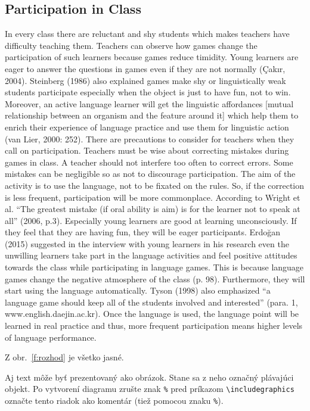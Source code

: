 \documentclass[10pt,twoside,english,a4paper]{article}
\begin{document}
 \subsection{Participation in Class }
In every class there are reluctant and shy students which makes teachers have difficulty teaching them. Teachers can observe how games change the participation of such learners because games reduce timidity. Young learners are eager to answer the questions in games even if they are not normally (Çakır, 2004). Steinberg (1986) also explained games make shy or linguistically weak students participate especially when the object is just to have fun, not to win. Moreover, an active language learner will get the linguistic affordances [mutual relationship between an organism and the feature around it] which help them to enrich their experience of language practice and use them for linguistic action (van Lier, 2000: 252). There are precautions to consider for teachers when they call on participation. Teachers must be wise about correcting mistakes during games in class. A teacher should not interfere too often to correct errors. Some mistakes can be negligible so as not to discourage participation. The aim of the activity is to use the language, not to be fixated on the rules. So, if the correction is less frequent, participation will be more commonplace. According to Wright et  al.  “The greatest  mistake (if oral ability  is aim) is  for the learner not  to speak  at all” (2006, p.3). Especially young learners are good at learning unconsciously. If they feel that they are having fun, they will be eager participants. Erdoğan  (2015) suggested in the interview with young learners in his research even the unwilling learners take part in the language activities and feel positive attitudes towards the class while participating in language games. This is because language games change the negative atmosphere of the class (p. 98). Furthermore, they will start using the language automatically. Tyson (1998) also emphasized “a language game should keep all of the students involved and interested” (para. 1, www.english.daejin.ac.kr). Once the language is used, the language point will be learned in real practice and thus, more frequent participation means higher  levels of language performance. 

Z obr.~\ref{f:rozhod} je všetko jasné. 

\begin{figure*}[tbh]
\centering
Aj text môže byť prezentovaný ako obrázok. Stane sa z neho označný plávajúci objekt. Po vytvorení diagramu zrušte znak \texttt{\%} pred príkazom \verb|\includegraphics| označte tento riadok ako komentár (tiež pomocou znaku \texttt{\%}).
\caption{Rozhodujúci argument.}
\label{f:rozhod}
\end{figure*}
\end{document}
